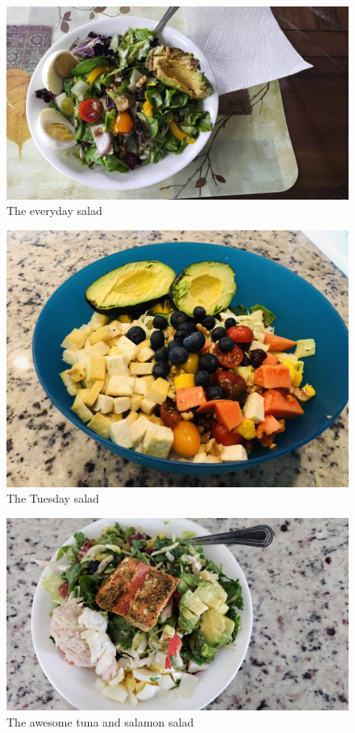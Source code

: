 \documentclass[oneside]{book}
\begin{document}
\begin{figure}
\centering
\includegraphics{pictures/everyday-salad.jpg}
\caption{The everyday salad}
\end{figure}

\begin{figure}
\centering
\includegraphics{pictures/the-tuesday-salad.jpg}
\caption{The Tuesday salad}
\end{figure}

\begin{figure}
\centering
\includegraphics{pictures/tuna-treat-salad-w-salmon-for-company.jpg}
\caption{The awesome tuna and salamon salad}
\end{figure}
\end{document}
